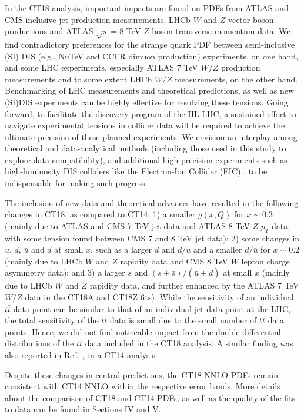 In the CT18 analysis, important impacts are found on PDFs from ATLAS and CMS inclusive jet production measurements, LHCb $W$ and $Z$ vector boson productions and ATLAS $\sqrt{s}=8$ TeV $Z$ boson transverse momentum data.
We find contradictory preferences for the strange quark PDF between semi-inclusive (SI) DIS (e.g., NuTeV and CCFR dimuon production) experiments, on one hand, and some LHC experiments, especially ATLAS 7 TeV $W/Z$ production measurements and to some extent LHCb $W/Z$ measurements, on the other hand. Benchmarking of LHC measurements and theoretical predictions, as well as new (SI)DIS experiments can be highly effective for resolving these tensions. Going forward, to
facilitate the discovery program of the HL-LHC, a sustained effort to navigate experimental tensions in collider data will be required to
achieve the ultimate precision of these planned experiments.  We envision an interplay among theoretical and data-analytical methods (including those
used in this study to explore data compatibility), and additional high-precision experiments such as high-luminosity DIS colliders like the
Electron-Ion Collider (EIC) \cite{Accardi:2012qut}, to be indispensable for making such progress.


 

The inclusion of new data and theoretical advances have resulted in the following changes in CT18, as compared to CT14: 
1) a smaller $g(x,Q)$ for $x \sim 0.3$ (mainly due to ATLAS and CMS 7 TeV jet data and ATLAS 8 TeV $Z$ $p_T$ data, with some tension found between CMS 7 and 8 TeV jet data); 
2) some changes in $u$, $d$, $\bar u$ and $\bar d$ at small $x$, such as a larger $d$ and $d/u$ and a smaller $\bar d / \bar u$ for $x \sim 0.2$ (mainly due to LHCb $W$ and $Z$ rapidity data and CMS 8 TeV $W$ lepton charge asymmetry data); and 
3) a larger $s$ and $(s+\bar s)/(\bar u + \bar d)$ at small $x$ (mainly due to LHCb $W$ and $Z$ rapidity data, and further enhanced by the ATLAS 7 TeV $W/Z$ data in the CT18A and CT18Z fits).
While the sensitivity of an individual $t \bar t$ data point can be similar to that of an individual jet data point at the LHC, the total sensitivity of the $t \bar t$ data is small due to the small number of  $t \bar t$ data points. Hence, we did not find noticeable impact from the double differential distributions of the $t \bar t$ data included in the CT18 analysis. A similar finding was also reported in Ref.~\cite{Hou:2019jxd}, in a CT14 analysis. 

Despite these changes in central predictions, the CT18 NNLO PDFs remain consistent with CT14 NNLO within the respective error bands.
More details about the comparison of CT18 and CT14 PDFs, as well as the quality of the fits to data can be found in Sections IV and V. 

